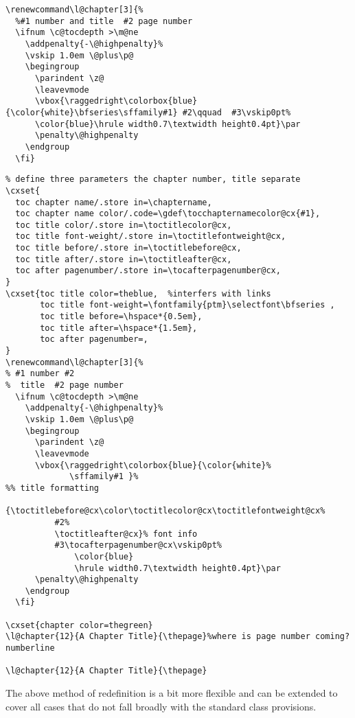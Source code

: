 \begin{lstlisting}
\renewcommand\l@chapter[3]{%
  %#1 number and title  #2 page number
  \ifnum \c@tocdepth >\m@ne
    \addpenalty{-\@highpenalty}%
    \vskip 1.0em \@plus\p@
    \begingroup
      \parindent \z@
      \leavevmode
      \vbox{\raggedright\colorbox{blue}{\color{white}\bfseries\sffamily#1} #2\qquad  #3\vskip0pt%
      \color{blue}\hrule width0.7\textwidth height0.4pt}\par
      \penalty\@highpenalty
    \endgroup
  \fi}
\end{lstlisting}

\begin{lstlisting}
% define three parameters the chapter number, title separate
\cxset{
  toc chapter name/.store in=\chaptername,
  toc chapter name color/.code=\gdef\tocchapternamecolor@cx{#1},
  toc title color/.store in=\toctitlecolor@cx,
  toc title font-weight/.store in=\toctitlefontweight@cx,
  toc title before/.store in=\toctitlebefore@cx,
  toc title after/.store in=\toctitleafter@cx,
  toc after pagenumber/.store in=\tocafterpagenumber@cx,
}
\cxset{toc title color=theblue,  %interfers with links
       toc title font-weight=\fontfamily{ptm}\selectfont\bfseries ,
       toc title before=\hspace*{0.5em},
       toc title after=\hspace*{1.5em},
       toc after pagenumber=,
}
\renewcommand\l@chapter[3]{%
% #1 number #2
%  title  #2 page number
  \ifnum \c@tocdepth >\m@ne
    \addpenalty{-\@highpenalty}%
    \vskip 1.0em \@plus\p@
    \begingroup
      \parindent \z@
      \leavevmode
      \vbox{\raggedright\colorbox{blue}{\color{white}%
             \sffamily#1 }%
%% title formatting
        {\toctitlebefore@cx\color\toctitlecolor@cx\toctitlefontweight@cx%
          #2%
          \toctitleafter@cx}% font info
          #3\tocafterpagenumber@cx\vskip0pt%
              \color{blue}
              \hrule width0.7\textwidth height0.4pt}\par
      \penalty\@highpenalty
    \endgroup
  \fi}

\cxset{chapter color=thegreen}
\l@chapter{12}{A Chapter Title}{\thepage}%where is page number coming?numberline

\l@chapter{12}{A Chapter Title}{\thepage}
\end{lstlisting}


The above method of redefinition is a bit more flexible and can be extended to cover all cases that do not fall broadly with the standard class provisions.


